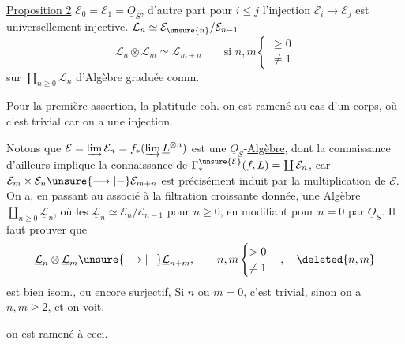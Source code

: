 \uline{Proposition 2} $\mathcal E_0=\mathcal E_1=\underline O_S$, d'autre part pour $i\leq j$ l'injection $\mathcal E_i\longrightarrow\mathcal E_j$ est  universellement injective.
  $\mathcal L_n\simeq\mathcal E_{\unsure{n}}/\mathcal E_{n-1}$  
\[
\mathcal L_n\otimes\mathcal L_m\simeq\mathcal L_{m+n}\qquad\text{si }n,m\begin{cases}\geq0\\\neq1\end{cases}
\]
   sur $\coprod_{n\geq0}\mathcal L_n$  d'Algèbre graduée comm.

Pour la première assertion,  la platitude coh. on est ramené au cas d'un corps, où c'est trivial car on a une injection.

Notons que $\mathcal E=\varinjlim\mathcal E_n=f_*(\varinjlim\underline L^{\otimes n})$ est une $\underline O_S$-\uline{Algèbre}, dont la connaissance d'ailleurs implique la connaissance de $\underline\Gamma_*^{\unsure{\mathcal E}}(f,\underline L)=\coprod\mathcal E_n$, car $\mathcal E_m\times\mathcal E_n\unsure{\longrightarrow|-}\mathcal E_{m+n}$ est précisément induit par la multiplication de $\mathcal E$. On a, en passant au  associé à la filtration croissante donnée, une Algèbre $\coprod_{n\geq0}\underline{\mathcal L}_n$, où les $\underline{\mathcal L}_n\simeq\mathcal E_n/\mathcal E_{n-1}$ pour $n\geq0$, en modifiant pour $n=0$ par $\underline O_S$. Il faut prouver que
\[
\underline{\mathcal L}_n\otimes\underline{\mathcal L}_m\unsure{\longrightarrow|-}\underline{\mathcal L}_{n+m},\qquad n,m\begin{cases}>0\\\neq1\end{cases},\quad\deleted{n,m}
\]
est bien isom., ou encore surjectif,  Si $n$ ou $m=0$,  c'est trivial, sinon on a $n,m\geq2$, et on voit.



on est ramené à ceci.

